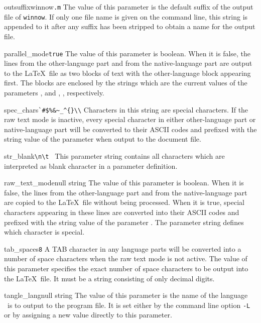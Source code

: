 \begin{describepara}{outsuffixwinnow}{\verb*|.m|}\describe
The value of this parameter is the default suffix of the output file
of {\tt winnow}. If only one file name is given on the command line,
this string is appended to it after any suffix has been stripped to
obtain a name for the output file.
\end{describepara}
\begin{describepara}{parallel_mode}{\verb*|true|}\describe
The value of this parameter is boolean. When it is false, the lines
from the other-language part and from the native-language part are
output to the \LaTeX\ file as two blocks of text with the other-language
block appearing first. The blocks are enclosed by the strings which
are the current values of the parameters ,
 and ,
, respectively.
\end{describepara}
\begin{describepara}{spec_chars}{\verb*|`#$%&~_^{}\\|}\describe
Characters in this string are special characters. If the raw text mode
is inactive, every special character in either other-language part or
native-language part will be converted to their ASCII codes and
prefixed with the string value of the parameter 
when output to the document file.
\end{describepara}
\begin{describepara}{str_blank}{\verb*|\n\t |}\describe
This parameter string contains all characters which are interpreted as
blank character in a parameter definition.
\end{describepara}
\begin{describepara}{raw_text_mode}{null string}\describe
The value of this parameter is boolean. When it is false, the lines
from the other-language part and from the native-language part are
copied to the \LaTeX\ file without being processed. When it is true,
special characters appearing in these lines are converted into their
ASCII codes and prefixed with the string value of the parameter
. The parameter string  defines
which character is special.
\end{describepara}
\begin{describepara}{tab_spaces}{\verb*|8|}\describe
A TAB character in  any language parts will be converted into a number
of space characters when the raw text mode is not active.
The value of this parameter specifies the exact number of space characters
to be output into the \LaTeX\ file.
It must be a string consisting of only decimal digits.
\end{describepara}
\begin{describepara}{tangle_lang}{null string}\describe
The value of this parameter is the name of the language \tangle\
is to output to the program file. It is set either by the command line
option {\tt -L} or by assigning a new value directly to this parameter.
\end{describepara}


